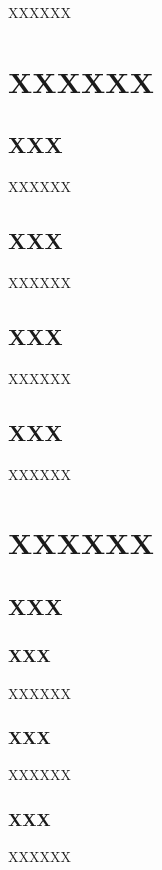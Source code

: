 \documentclass[12pt]{article}
\begin{document}
\begin{CJK*}{UTF8}{bsmi}
XXXXXX




\newpage
\section{XXXXXX}

\subsection{XXX}
XXXXXX


\subsection{XXX}
XXXXXX




\subsection{XXX}
XXXXXX



\subsection{XXX}
XXXXXX





\newpage
\section{XXXXXX}
\subsection{XXX}

\subsubsection{XXX}
XXXXXX


\par

\subsubsection{XXX}
XXXXXX


\par
\subsubsection{XXX}
XXXXXX



\end{CJK*}
\end{document}
